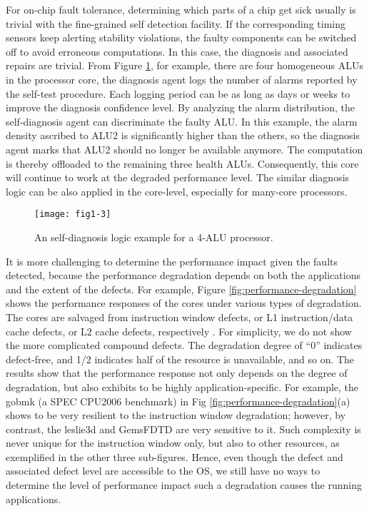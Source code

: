 For on-chip fault tolerance, determining which parts of a chip get sick usually is trivial with the fine-grained self detection facility. If the corresponding timing sensors keep alerting stability violations, the faulty components can be switched off to avoid erroneous computations. In this case, the diagnosis and associated repairs are trivial. From Figure \ref{fig:self-diagnosis-example}, for example, there are four homogeneous ALUs in the processor core, the diagnosis agent logs the number of alarms reported by the self-test procedure. Each logging period can be as long as days or weeks to improve the diagnosis confidence level. By analyzing the alarm distribution, the self-diagnosis agent can discriminate the faulty ALU. In this example, the alarm density ascribed to ALU2 is significantly higher than the others, so the diagnosis agent marks that ALU2 should no longer be available anymore. The computation is thereby offloaded to the remaining three health ALUs. Consequently, this core will continue to work at the degraded performance level. The similar diagnosis logic can be also applied in the core-level, especially for many-core processors.

\begin{figure}[t]
\centering
\texttt{[image: fig1-3]}
\caption{An self-diagnosis logic example for a 4-ALU processor.}
\label{fig:self-diagnosis-example} 
\end{figure}

It is more challenging to determine the performance impact given the faults detected, because the performance degradation depends on both the applications and the extent of the defects. For example, Figure \ref{fig:performance-degradation} shows the performance responses of the cores under various types of degradation. The cores are salvaged from instruction window defects, or L1 instruction/data cache defects, or L2 cache defects, respectively \cite{salvaging}. For simplicity, we do not show the more complicated compound defects. The degradation degree of “0” indicates defect-free, and 1/2 indicates half of the resource is unavailable, and so on. The results show that the performance response not only depends on the degree of degradation, but also exhibits to be highly application-specific. For example, the gobmk (a SPEC CPU2006 benchmark) in Fig \ref{fig:performance-degradation}(a) shows to be very resilient to the instruction window degradation; however, by contrast, the leslie3d and GemsFDTD are very sensitive to it. Such complexity is never unique for the instruction window only, but also to other resources, as exemplified in the other three sub-figures. Hence, even though the defect and associated defect level are accessible to the OS, we still have no ways to determine the level of performance impact such a degradation causes the running applications.

